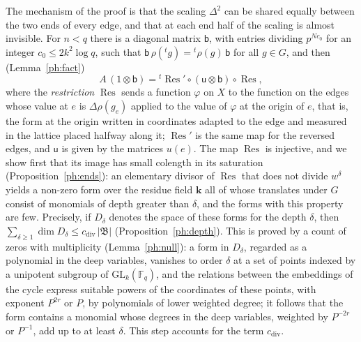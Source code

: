 \documentclass[10pt]{amsart}
\theoremstyle{definition}
\theoremstyle{remark}
\providecommand{\auF}{\mathbb F}
\providecommand{\auGL}{\mathrm{GL}}
\providecommand{\phB}{\mathfrak B}
\providecommand{\phcd}{c_{\mathrm{div}}}
\providecommand{\phk}{\boldsymbol k}
\begin{document}
The mechanism of the proof is that the scaling $\Delta^2$ can be shared equally between the two ends of every
edge, and that at each end half of the scaling is almost invisible. For $n<q$ there is a
diagonal matrix $\mathsf b$, with entries dividing $p^{Nc_0}$ for an integer $c_0\le2k^2\log q$,
such that $\mathsf b\,\rho({}^tg)={}^t\rho(g)\,\mathsf b$ for all $g\in G$, and
then (Lemma~\ref{ph:fact})
\[
A\,(1\otimes\mathsf b)={}^t\operatorname{Res}'\circ(\mathsf u\otimes\mathsf b)\circ
\operatorname{Res},
\]
where the \emph{restriction} $\operatorname{Res}$ sends a function $\varphi$ on $X$ to the
function on the edges whose value at $e$ is $\Delta\rho(g_e)$ applied to the value of $\varphi$
at the origin of $e$, that is, the form at the origin written in coordinates adapted to the edge
and measured in the lattice placed halfway along it; $\operatorname{Res}'$ is the same map for the
reversed edges, and $\mathsf u$ is given by the matrices $u(e)$. The map $\operatorname{Res}$ is
injective, and we show first that its image has small colength in its saturation
(Proposition~\ref{ph:ends}): an elementary divisor of $\operatorname{Res}$ that does not divide
$w^{\delta}$ yields a non-zero form over the residue field $\phk$ all of whose translates under
$G$ consist of monomials of depth greater than $\delta$, and the forms with this property are few.
Precisely, if $D_\delta$ denotes the space of these forms for the depth $\delta$, then
$\sum_{\delta\ge1}\dim D_\delta\le\phcd\,|\phB|$ (Proposition~\ref{ph:depth}). This is proved by a
count of zeros with multiplicity (Lemma~\ref{ph:null}): a form in $D_\delta$, regarded as a
polynomial in the deep variables, vanishes to order $\delta$ at a set of points indexed by a
unipotent subgroup of $\auGL_k(\auF_q)$, and the relations between the embeddings of the cycle
express suitable powers of the coordinates of these points, with exponent $P^{2r}$ or $P$, by
polynomials of lower weighted degree; it follows that the form contains a monomial whose degrees
in the deep variables, weighted by $P^{-2r}$ or $P^{-1}$, add up to at least $\delta$. This step
accounts for the term $\phcd$.
\end{document}

